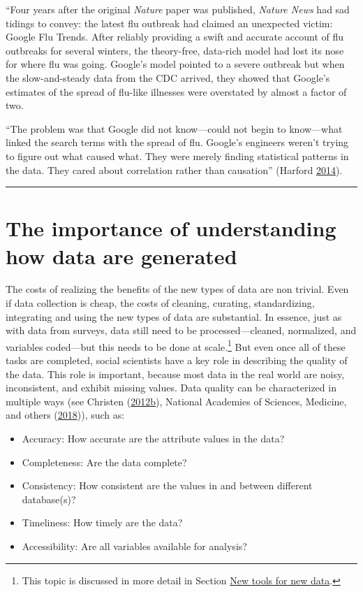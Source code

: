 \documentclass[]{krantz}
\providecommand{\tightlist}{%
  \setlength{\itemsep}{0pt}\setlength{\parskip}{0pt}}
\begin{document}
``Four years after the original \emph{Nature} paper was published,
\emph{Nature News} had sad tidings to convey: the latest flu outbreak
had claimed an unexpected victim: Google Flu Trends. After reliably
providing a swift and accurate account of flu outbreaks for several
winters, the theory-free, data-rich model had lost its nose for where
flu was going. Google's model pointed to a severe outbreak but when the
slow-and-steady data from the CDC arrived, they showed that Google's
estimates of the spread of flu-like illnesses were overstated by almost
a factor of two.

``The problem was that Google did not know---could not begin to
know---what linked the search terms with the spread of flu. Google's
engineers weren't trying to figure out what caused what. They were
merely finding statistical patterns in the data. They cared about
correlation rather than causation'' (Harford
\protect\hyperlink{ref-harford2014big}{2014}).

\begin{center}\rule{0.5\linewidth}{\linethickness}\end{center}

\section{The importance of understanding how data are
generated}\label{sec:1-4}

The costs of realizing the benefits of the new types of data are non
trivial. Even if data collection is cheap, the costs of cleaning,
curating, standardizing, integrating and using the new types of data are
substantial. In essence, just as with data from surveys, data still need
to be processed---cleaned, normalized, and variables coded---but this
needs to be done at scale.\footnote{This topic is discussed in more
  detail in Section \protect\hyperlink{sec:1-5}{New tools for new data}.}
But even once all of these tasks are completed, social scientists have a
key role in describing the quality of the data. This role is important,
because most data in the real world are noisy, inconsistent, and exhibit
missing values. Data quality can be characterized in multiple ways (see
Christen
(\protect\hyperlink{ref-christen2012data}{2012}\protect\hyperlink{ref-christen2012data}{b}),
National Academies of Sciences, Medicine, and others
(\protect\hyperlink{ref-national2018federal}{2018})), such as:

\begin{itemize}
\tightlist
\item
  Accuracy: How accurate are the attribute values in the data?
\item
  Completeness: Are the data complete?
\item
  Consistency: How consistent are the values in and between different
  database(s)?
\item
  Timeliness: How timely are the data?
\item
  Accessibility: Are all variables available for analysis?
\end{itemize}
\end{document}
